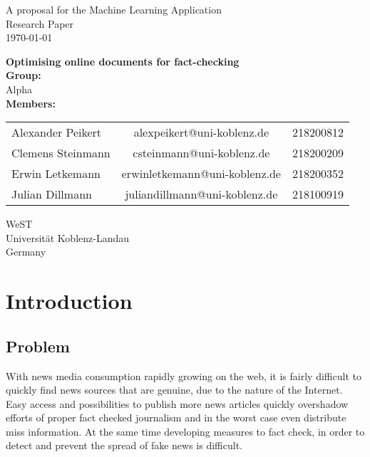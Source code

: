 \documentclass[10pt]{article}
\begin{document}
\begin{titlepage}
\begin{center}

A proposal for the Machine Learning Application\\
Research Paper\\
\vspace{4mm}
\today
\vspace{4mm}
\end{center}
\begin{center}
\textbf{\Large Optimising online documents for fact-checking}\\
\vspace{15mm}
\textbf{Group:}\\
\vspace{2mm}
Alpha \\
\vspace{15mm}
\textbf {Members:}\\
\vspace{2mm}

\begin{tabular}{ l c r }
  Alexander Peikert & alexpeikert@uni-koblenz.de & 218200812 \\
  Clemens Steinmann & csteinmann@uni-koblenz.de & 218200209 \\
  Erwin Letkemann & erwinletkemann@uni-koblenz.de & 218200352 \\
  Julian Dillmann & juliandillmann@uni-koblenz.de & 218100919 \\
\end{tabular}
\end{center}
\vfill
\begin{center}
\vspace{8mm}
WeST \\
Universität Koblenz-Landau \\
Germany \\
\vspace{2mm}
\end{center}
\clearpage
\end{titlepage}


\section{Introduction}
\subsection{Problem}
With news media consumption rapidly growing on the web, it is fairly difficult to quickly find news sources that are genuine, due to the nature of the Internet.
Easy access and possibilities to publish more news articles quickly overshadow efforts of proper fact checked journalism and in the worst case even distribute miss information.
At the same time developing measures to fact check, in order to detect and prevent the spread of fake news is difficult.
\end{document}
